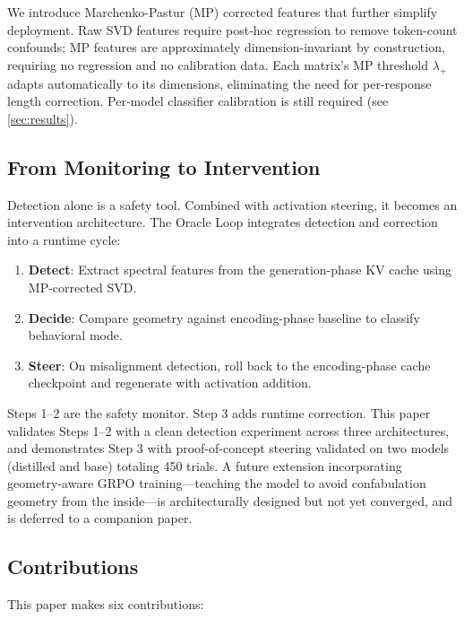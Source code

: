 We introduce Marchenko-Pastur (MP) corrected features that further
simplify deployment. Raw SVD features require post-hoc regression to
remove token-count confounds; MP features are approximately
dimension-invariant by construction, requiring no regression and no
calibration data. Each matrix's MP threshold $\lambda_+$ adapts
automatically to its dimensions, eliminating the need for per-response
length correction. Per-model classifier calibration is still required
(see \cref{sec:results}).

\subsection{From Monitoring to Intervention}

Detection alone is a safety tool. Combined with activation steering,
it becomes an intervention architecture.
The Oracle Loop integrates detection and correction into a runtime cycle:

\begin{enumerate}[nosep]
  \item \textbf{Detect}: Extract spectral features from the generation-phase
    KV cache using MP-corrected SVD.
  \item \textbf{Decide}: Compare geometry against encoding-phase baseline to
    classify behavioral mode.
  \item \textbf{Steer}: On misalignment detection, roll back to the
    encoding-phase cache checkpoint and regenerate with activation
    addition.
\end{enumerate}

Steps 1--2 are the safety monitor. Step 3 adds runtime correction.
This paper validates Steps 1--2 with a clean detection experiment
across three architectures, and demonstrates Step 3 with proof-of-concept
steering validated on two models (distilled and base) totaling 450 trials.
A future extension incorporating geometry-aware GRPO training---teaching
the model to avoid confabulation geometry from the inside---is
architecturally designed but not yet converged, and is deferred to
a companion paper.

\subsection{Contributions}

This paper makes six contributions:

